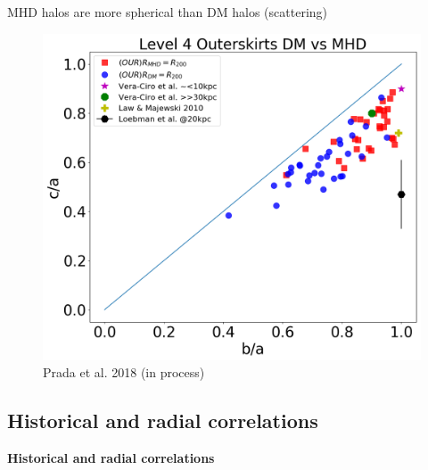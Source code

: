 \documentclass[xcolor=dvipsnames]{beamer}
\begin{document}
\begin{frame}

\centering
MHD halos are more spherical than DM halos (scattering)
\begin{figure}[!ht]
  \centering
  \includegraphics[width=0.6\columnwidth]{./pics/Triaxiality_Outter_lvl4.png}
  \caption{\tiny Prada et al. 2018 (in process)}
  \hfil
\end{figure}
\normalsize

\end{frame}


\subsection{Historical and radial correlations}
\begin{frame}
\centering
\LARGE
\textbf{Historical and radial correlations}
\normalsize
\end{frame}
\end{document}
